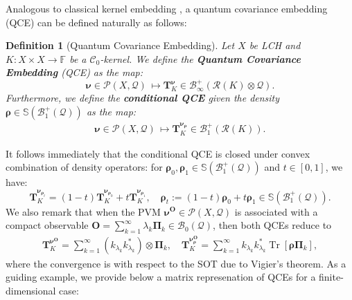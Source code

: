 \documentclass[noinfoline]{imsart}\setcounter{tocdepth}{2}
\renewcommand{\b}[1]{\mathbb{#1}} %
\newcommand{\m}[1]{\mathbf{#1}} %
\newcommand{\s}[1]{\mathscr{#1}} %
\renewcommand{\c}[1]{\mathcal{#1}} %
\newcommand{\mb}[1]{\boldsymbol{#1}} %
\newcommand{\tr}[1]{\operatorname{Tr}\left[#1\right]}
\theoremstyle{plain}
\newtheorem{definition}[theorem]{Definition}
\begin{document}
Analogous to classical kernel embedding \cite{smola2007hilbert}, a quantum covariance embedding (QCE) can be defined naturally as follows:
\begin{definition}[Quantum Covariance Embedding]
Let $X$ be LCH and $K:X \times X \to \b{F}$ be a $\c{C}_{0}$-kernel. We define the \textbf{Quantum Covariance Embedding} (QCE) as the map:
\begin{equation*}
    \mb{\nu} \in \s{P}(X, \c{Q}) \, \mapsto \m{T}_{K}^{\mb{\nu}} \in \c{B}_{\infty}^{+}(\c{R}(K) \otimes \c{Q}).
\end{equation*}
Furthermore, we define the \textbf{conditional QCE} 
given the density $\mb{\rho} \in \b{S}(\c{B}_{1}^{+}(\c{Q}))$ as the map:
\begin{align}\label{eq:contra:QCE:trace}
    \mb{\nu} \in \s{P}(X, \c{Q}) \, \mapsto \m{T}_{K}^{\mb{\nu}_{\mb{\rho}}} \in \c{B}_{1}^{+}(\c{R}(K)).
\end{align}
\end{definition}

It follows immediately that the conditional QCE is closed under convex combination of density operators: for $\mb{\rho}_{0}, \mb{\rho}_{1} \in \b{S}(\c{B}_{1}^{+}(\c{Q}))$ and $t \in [0, 1]$, we have:
\begin{equation}\label{eq:embed:cvx:combi}
    \m{T}_{K}^{\mb{\nu}_{\mb{\rho}_{t}}} = (1-t) \m{T}_{K}^{\mb{\nu}_{\mb{\rho}_{0}}} + t \m{T}_{K}^{\mb{\nu}_{\mb{\rho}_{1}}}, \quad \mb{\rho}_{t} := (1-t) \mb{\rho}_{0} + t \mb{\rho}_{1} \in \b{S}(\c{B}_{1}^{+}(\c{Q})).
\end{equation}
We also remark that when the PVM $\mb{\nu}^{\m{O}} \in \s{P}(X, \c{Q})$ is associated with a compact observable $\m{O} = \sum_{k=1}^{\infty} \lambda_{k} \mb{\Pi}_{k} \in \c{B}_{0}(\c{Q})$, then both QCEs reduce to
\begin{align*}
    \m{T}_{K}^{\mb{\nu}^{\m{O}}} = \sum_{k=1}^{\infty} (k_{\lambda_{k}} k_{\lambda_{k}}^{*}) \otimes \m{\Pi}_{k}, \quad \m{T}_{K}^{\mb{\nu}^{\m{O}}_{\mb{\rho}}} = \sum_{k=1}^{\infty} k_{\lambda_{k}} k_{\lambda_{k}}^{*} \tr{\mb{\rho} \m{\Pi}_{k}},
\end{align*}
where the convergence is with respect to the SOT due to Vigier's theorem. 
As a guiding example, we provide below a matrix represenation of QCEs for a finite-dimensional case:
\end{document}
